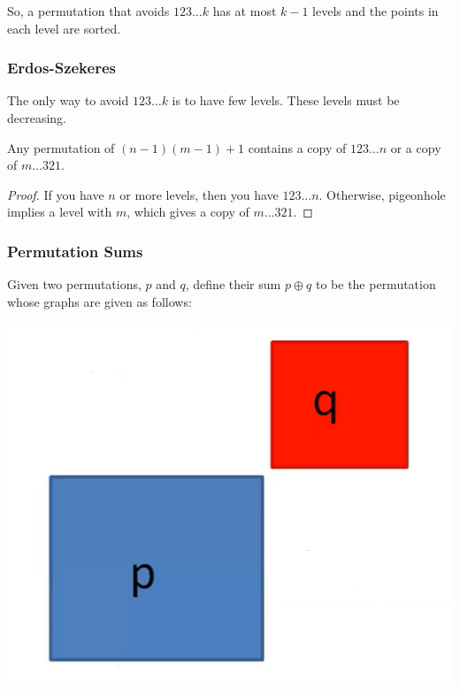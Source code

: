 \documentclass[letterpaper]{article}
\begin{document}
So, a permutation that avoids $123\dots k$ has at most $k - 1$ levels and the points in each level are sorted. 

\subsubsection{Erdos-Szekeres}
The only way to avoid $123\dots k$ is to have few levels. These levels must be decreasing. 

\begin{theorem}{}{}
    Any permutation of $(n - 1)(m - 1) + 1$ contains a copy of $123\dots n$ or a copy of $m\dots 321$. 
\end{theorem}

\begin{proof}
    If you have $n$ or more levels, then you have $123\dots n$. Otherwise, pigeonhole implies a level with $m$, which gives a copy of $m\dots 321$. 
\end{proof}

\subsubsection{Permutation Sums}
\begin{definition}{}{}
    Given two permutations, $p$ and $q$, define their sum $p \oplus q$ to be the permutation whose graphs are given as follows:
    \begin{center}
        \includegraphics[scale=0.5]{img/p_sum.PNG}
    \end{center}
\end{definition}
\end{document}
